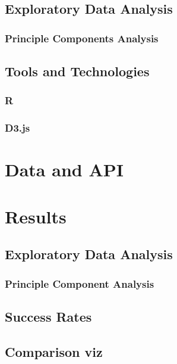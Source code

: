 \documentclass[a4paper,11pt]{article}
\begin{document}
\subsection{Exploratory Data Analysis} %


\subsubsection{Principle Components Analysis}


\subsection{Tools and Technologies} %
\subsubsection{R} %


\subsubsection{D3.js} %

\section{Data and API}

\section{Results}
\subsection{Exploratory Data Analysis}

\subsubsection{Principle Component Analysis}

\label{sec:PCA}

\subsection{Success Rates}


\subsection{Comparison viz}

\end{document}
